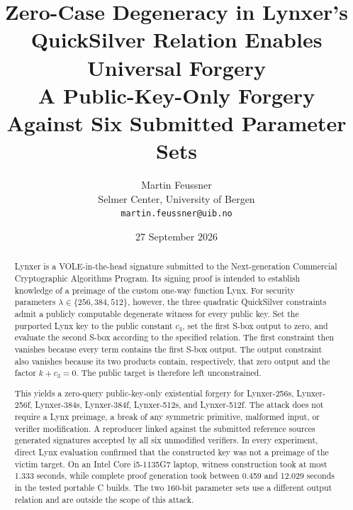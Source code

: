 \documentclass[11pt,a4paper]{article}
\title{\bfseries Zero-Case Degeneracy in Lynxer's QuickSilver Relation Enables Universal Forgery\\[0.35em]
\large A Public-Key-Only Forgery Against Six Submitted Parameter Sets}
\author{Martin Feussner\\
\small Selmer Center, University of Bergen\\
\small \texttt{martin.feussner@uib.no}}
\date{27 September 2026}
\begin{document}
\maketitle

\begin{center}
\end{center}
\vspace{0.7em}

\begin{abstract}
Lynxer is a VOLE-in-the-head signature submitted to the Next-generation Commercial
Cryptographic Algorithms Program.  Its signing proof is intended to establish knowledge of
a preimage of the custom one-way function Lynx.  For security parameters
$\lambda\in\{256,384,512\}$, however, the three quadratic QuickSilver constraints admit a
publicly computable degenerate witness for every public key.  Set the purported Lynx key to
the public constant $c_3$, set the first S-box output to zero, and evaluate the second S-box
according to the specified relation.  The first constraint then vanishes because every term
contains the first S-box output.  The output constraint also vanishes because its two
products contain, respectively, that zero output and the factor $k+c_3=0$.  The public
target is therefore left unconstrained.

This yields a zero-query public-key-only existential forgery for Lynxer-256s, Lynxer-256f,
Lynxer-384s, Lynxer-384f, Lynxer-512s, and Lynxer-512f.  The attack does not require a Lynx
preimage, a break of any symmetric primitive, malformed input, or verifier modification.  A
reproducer linked against the submitted reference sources generated signatures accepted by
all six unmodified verifiers.  In every experiment, direct Lynx evaluation confirmed that
the constructed key was not a preimage of the victim target.  On an Intel Core i5-1135G7
laptop, witness construction took at most 1.333 seconds, while complete proof generation
took between 0.459 and 12.029 seconds in the tested portable C builds.  The two 160-bit
parameter sets use a different output relation and are outside the scope of this attack.
\end{abstract}
\end{document}
